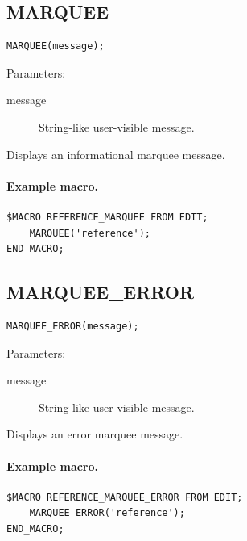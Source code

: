 \documentclass[a4paper,10pt,twoside,openany]{book}
\newenvironment{mrmacextension}{\begin{changebar}}{\end{changebar}}
\begin{document}
\begin{mrmacextension}
\label{prim:procedure-marquee}
\subsection*{MARQUEE}
\begin{verbatim}
MARQUEE(message);
\end{verbatim}
Parameters:
\begin{description}
\item[message] String-like user-visible message.
\end{description}

Displays an informational marquee message.

\paragraph{Example macro.}
\begin{verbatim}
$MACRO REFERENCE_MARQUEE FROM EDIT;
    MARQUEE('reference');
END_MACRO;
\end{verbatim}
\end{mrmacextension}

\begin{mrmacextension}
\label{prim:procedure-marquee-error}
\subsection*{MARQUEE\_ERROR}
\begin{verbatim}
MARQUEE_ERROR(message);
\end{verbatim}
Parameters:
\begin{description}
\item[message] String-like user-visible message.
\end{description}

Displays an error marquee message.

\paragraph{Example macro.}
\begin{verbatim}
$MACRO REFERENCE_MARQUEE_ERROR FROM EDIT;
    MARQUEE_ERROR('reference');
END_MACRO;
\end{verbatim}
\end{mrmacextension}
\end{document}
